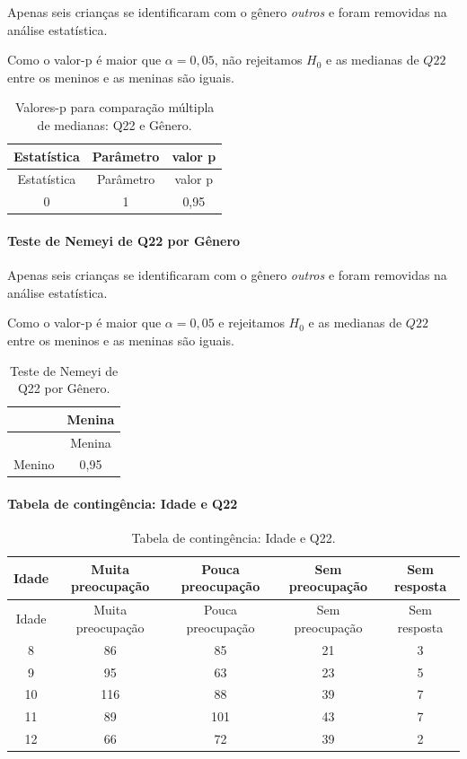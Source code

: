 \documentclass[]{article}
\let\oldparagraph\paragraph
\renewcommand{\paragraph}[1]{\oldparagraph{#1}\mbox{}}
\begin{document}
Apenas seis crianças se identificaram com o gênero \emph{outros} e foram removidas na análise estatística.

Como o valor-p é maior que \(\alpha=0,05\), não rejeitamos \(H_0\) e as medianas de \(Q22\) entre os meninos e as meninas são iguais.

\begin{longtable}[]{@{}ccc@{}}
\caption{\label{tab:unnamed-chunk-376}Valores-p para comparação múltipla de medianas: Q22 e Gênero.}\tabularnewline
\toprule
Estatística & Parâmetro & valor p\tabularnewline
\midrule
\endfirsthead
\toprule
Estatística & Parâmetro & valor p\tabularnewline
\midrule
\endhead
0 & 1 & 0,95\tabularnewline
\bottomrule
\end{longtable}

\hypertarget{teste-de-nemeyi-de-q22-por-guxeanero}{%
\paragraph{Teste de Nemeyi de Q22 por Gênero}\label{teste-de-nemeyi-de-q22-por-guxeanero}}

Apenas seis crianças se identificaram com o gênero \emph{outros} e foram removidas na análise estatística.

Como o valor-p é maior que \(\alpha=0,05\) e rejeitamos \(H_0\) e as medianas de \(Q22\) entre os meninos e as meninas são iguais.

\begin{longtable}[]{@{}lc@{}}
\caption{\label{tab:unnamed-chunk-377}Teste de Nemeyi de Q22 por Gênero.}\tabularnewline
\toprule
& Menina\tabularnewline
\midrule
\endfirsthead
\toprule
& Menina\tabularnewline
\midrule
\endhead
Menino & 0,95\tabularnewline
\bottomrule
\end{longtable}

\cleardoublepage

\hypertarget{tabela-de-continguxeancia-idade-e-q22}{%
\paragraph{Tabela de contingência: Idade e Q22}\label{tabela-de-continguxeancia-idade-e-q22}}

\begin{longtable}[]{@{}ccccc@{}}
\caption{\label{tab:unnamed-chunk-378}Tabela de contingência: Idade e Q22.}\tabularnewline
\toprule
Idade & Muita preocupação & Pouca preocupação & Sem preocupação & Sem resposta\tabularnewline
\midrule
\endfirsthead
\toprule
Idade & Muita preocupação & Pouca preocupação & Sem preocupação & Sem resposta\tabularnewline
\midrule
\endhead
8 & 86 & 85 & 21 & 3\tabularnewline
9 & 95 & 63 & 23 & 5\tabularnewline
10 & 116 & 88 & 39 & 7\tabularnewline
11 & 89 & 101 & 43 & 7\tabularnewline
12 & 66 & 72 & 39 & 2\tabularnewline
\bottomrule
\end{longtable}
\end{document}
